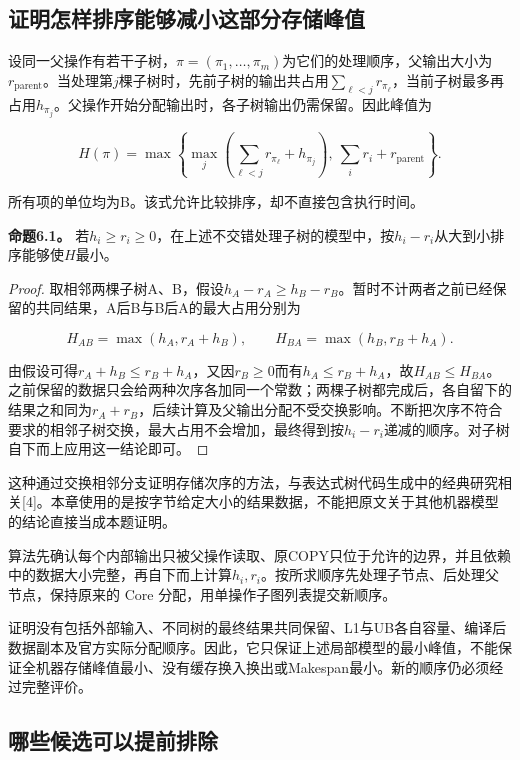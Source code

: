 \documentclass[anonymous,notoc]{gmcm2026}
\begin{document}
\subsection{证明怎样排序能够减小这部分存储峰值}

设同一父操作有若干子树，\(\pi=(\pi_1,\ldots,\pi_m)\)为它们的处理顺序，父输出大小为\(r_{\mathrm{parent}}\)。当处理第\(j\)棵子树时，先前子树的输出共占用\(\sum_{\ell<j}r_{\pi_\ell}\)，当前子树最多再占用\(h_{\pi_j}\)。父操作开始分配输出时，各子树输出仍需保留。因此峰值为

\[H(\pi)=\max\left\{\max_j\left(\sum_{\ell<j}r_{\pi_\ell}+h_{\pi_j}\right),\ \sum_i r_i+r_{\mathrm{parent}}\right\}.\]

所有项的单位均为B。该式允许比较排序，却不直接包含执行时间。

\textbf{命题6.1。} 若\(h_i\ge r_i\ge0\)，在上述不交错处理子树的模型中，按\(h_i-r_i\)从大到小排序能够使\(H\)最小。

\begin{proof} 取相邻两棵子树A、B，假设\(h_A-r_A\ge h_B-r_B\)。暂时不计两者之前已经保留的共同结果，A后B与B后A的最大占用分别为

\[H_{AB}=\max(h_A,r_A+h_B),\qquad H_{BA}=\max(h_B,r_B+h_A).\]

由假设可得\(r_A+h_B\le r_B+h_A\)，又因\(r_B\ge0\)而有\(h_A\le r_B+h_A\)，故\(H_{AB}\le H_{BA}\)。之前保留的数据只会给两种次序各加同一个常数；两棵子树都完成后，各自留下的结果之和同为\(r_A+r_B\)，后续计算及父输出分配不受交换影响。不断把次序不符合要求的相邻子树交换，最大占用不会增加，最终得到按\(h_i-r_i\)递减的顺序。对子树自下而上应用这一结论即可。\end{proof}

这种通过交换相邻分支证明存储次序的方法，与表达式树代码生成中的经典研究相关{[}4{]}。本章使用的是按字节给定大小的结果数据，不能把原文关于其他机器模型的结论直接当成本题证明。

算法先确认每个内部输出只被父操作读取、原COPY只位于允许的边界，并且依赖中的数据大小完整，再自下而上计算\(h_i,r_i\)。按所求顺序先处理子节点、后处理父节点，保持原来的 Core 分配，用单操作子图列表提交新顺序。

证明没有包括外部输入、不同树的最终结果共同保留、L1与UB各自容量、编译后数据副本及官方实际分配顺序。因此，它只保证上述局部模型的最小峰值，不能保证全机器存储峰值最小、没有缓存换入换出或Makespan最小。新的顺序仍必须经过完整评价。

\subsection{哪些候选可以提前排除}
\end{document}
